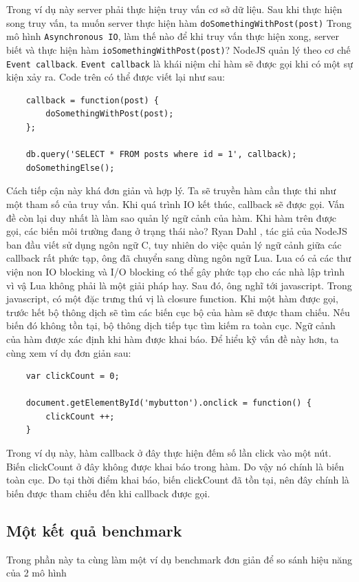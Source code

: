 \documentclass[a4paper,12pt]{report}
\begin{document}
	Trong ví dụ này server phải thực hiện truy vấn cơ sở dữ liệu. Sau khi thực hiện song truy vấn, ta muốn server thực hiện hàm \texttt{doSomethingWithPost(post)} Trong mô hình \texttt{Asynchronous IO}, làm thế nào để khi truy vấn thực hiện xong, server biết và thực hiện hàm \texttt{ioSomethingWithPost(post)}? NodeJS quản lý theo cơ chế \texttt{Event callback}. \texttt{Event callback} là khái niệm chỉ hàm sẽ được gọi khi có một sự kiện xảy ra.
	Code trên có thể được viết lại như sau:
\begin{verbatim}
	callback = function(post) {
		doSomethingWithPost(post);
	};

	db.query('SELECT * FROM posts where id = 1', callback);
	doSomethingElse();
\end{verbatim}
	Cách tiếp cận này khá đơn giản và hợp lý. Ta sẽ truyền hàm cần thực thi như một tham số của truy vấn. Khi quá trình IO kết thúc, callback sẽ được gọi.
	Vấn đề còn lại duy nhất là làm sao quản lý ngữ cảnh của hàm. Khi hàm trên được gọi, các biến môi trường đang ở trạng thái nào? Ryan Dahl , tác giả của NodeJS ban đầu viết sử dụng ngôn ngữ C, tuy nhiên do việc quản lý ngữ cảnh giữa các callback rất phức tạp, ông đã chuyển sang dùng ngôn ngữ Lua. Lua có cả các thư viện non IO blocking và I/O blocking có thể gây phức tạp cho các nhà lập trình vì vậ Lua không phải là một giải pháp hay. Sau đó, ông nghĩ tới javascript. Trong javascript, có một đặc trưng thú vị là closure function. Khi một hàm được gọi, trước hết bộ thông dịch sẽ tìm các biến cục bộ của hàm sẽ được tham chiếu. Nếu biến đó không tồn tại, bộ thông dịch tiếp tục tìm kiếm ra toàn cục. Ngữ cảnh của hàm được xác định khi hàm được khai báo. Để hiểu kỹ vấn đề này hơn, ta cùng xem ví dụ đơn giản sau:

\begin{verbatim}
	var clickCount = 0;
	
	document.getElementById('mybutton').onclick = function() {
		clickCount ++;
	}
\end{verbatim}
	Trong ví dụ này, hàm callback ở đây thực hiện đếm số lần click vào một nút. Biến clickCount ở đây không được khai báo trong hàm. Do vậy nó chính là biến toàn cục. Do tại thời điểm khai báo, biến clickCount đã tồn tại, nên đây chính là biến được tham chiếu đến khi callback được gọi.
	
\subsection{Một kết quả benchmark}
Trong phần này ta cùng làm một ví dụ benchmark đơn giản để so sánh hiệu năng của 2 mô hình
\end{document}
